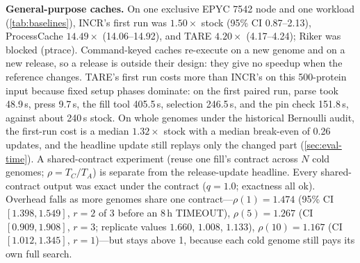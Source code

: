 \documentclass[letterpaper,twocolumn,10pt]{article}
\theoremstyle{definition}
\newcommand{\sys}{TARE\xspace}
\newcommand{\sys}{PARE\xspace}
\begin{document}
\textbf{General\nobreakdash-purpose caches.} On one exclusive EPYC 7542 node and one workload (\cref{tab:baselines}),
INCR's first run was $1.50\times$ stock (95\% CI 0.87--2.13), ProcessCache $14.49\times$ (14.06--14.92), and \sys
$4.20\times$ (4.17--4.24); Riker was blocked (ptrace). Command\nobreakdash-keyed caches re\nobreakdash-execute on a new genome and
on a new release, so a release is outside their design: they give no speedup when the reference changes. \sys's first
run costs more than INCR's on this 500\nobreakdash-protein input because fixed setup phases dominate: on the first paired run,
parse took 48.9\,s, press 9.7\,s, the fill tool 405.5\,s, selection 246.5\,s, and the pin check 151.8\,s, against about
240\,s stock. On whole genomes under the historical Bernoulli audit, the first\nobreakdash-run cost is a median $1.32\times$ stock with a median break\nobreakdash-even of
0.26 updates, and the headline update still replays only the changed part (\cref{sec:eval-time}).
A shared\nobreakdash-contract experiment (reuse one fill's contract across $N$ cold genomes; $\rho=T_C/T_A$) is separate from the release\nobreakdash-update headline. Every shared\nobreakdash-contract output was exact under the contract ($q{=}1.0$; exactness all ok). Overhead falls as more genomes share one contract---$\rho(1)=1.474$ (95\% CI $[1.398, 1.549]$, $r{=}2$ of 3 before an 8\,h TIMEOUT), $\rho(5)=1.267$ (CI $[0.909, 1.908]$, $r{=}3$; replicate values $1.660$, $1.008$, $1.133$), $\rho(10)=1.167$ (CI $[1.012, 1.345]$, $r{=}1$)---but stays above 1, because each cold genome still pays its own full search.
\end{document}
